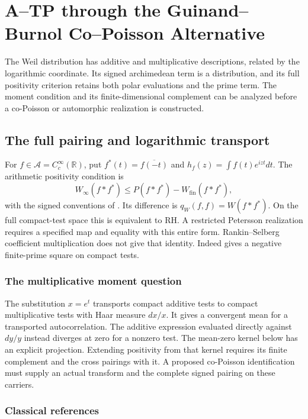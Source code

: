 \chapter{A--TP through the Guinand--Burnol Co--Poisson Alternative}
\label{v4-arith:w7-i:chapter}


The Weil distribution has additive and multiplicative descriptions,
related by the logarithmic coordinate. Its signed archimedean term
is a distribution, and its full positivity criterion retains both
polar evaluations and the prime term. The moment condition and
its finite-dimensional complement can be analyzed before a
co-Poisson or automorphic realization is constructed.

\section{The full pairing and logarithmic transport}
\label{v4-arith:w7-i:orientation}
For $f\in\mathscr A=C_c^\infty(\mathbb R)$, put
$f^*(t)=\overline{f(-t)}$ and $h_f(z)=\int f(t)e^{izt}dt$.
The arithmetic positivity condition is
\begin{equation}
\label{v4-arith:w7-i:eq:ATP-recall}
 W_\infty(f*f^*)\le P(f*f^*)-W_{\mathrm{fin}}(f*f^*),
\end{equation}
with the signed conventions of
.
Its difference is $q_W(f,f)=W(f*f^*)$.
On the full compact-test space this is equivalent to RH.
A restricted Petersson realization requires a specified map and
equality with this entire form. Rankin--Selberg coefficient
multiplication does not give that identity.
Indeed  gives a negative
finite-prime square on compact tests.

\subsection{The multiplicative moment question}
\label{v4-arith:w7-i:domain}
The substitution $x=e^t$ transports compact additive tests to
compact multiplicative tests with Haar measure $dx/x$.
It gives a convergent mean for a transported autocorrelation.
The additive expression evaluated directly against $dy/y$ instead
diverges at zero for a nonzero test. The mean-zero kernel below
has an explicit projection. Extending positivity from that kernel
requires its finite complement and the cross pairings with it.
A proposed co-Poisson identification must supply an actual transform
and the complete signed pairing on these carriers.
\subsection{Classical references}
\label{v4-arith:w7-i:sources}

